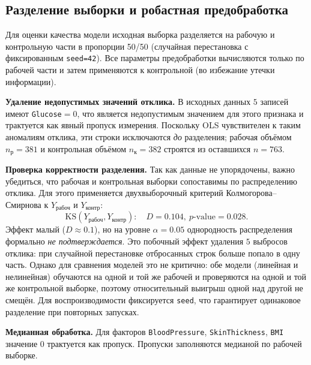 \documentclass[a4paper, 14pt]{extarticle}
\begin{document}
\subsection{Разделение выборки и робастная предобработка}
Для оценки качества модели исходная выборка разделяется на рабочую и контрольную части в пропорции
50/50 (случайная перестановка с фиксированным \texttt{seed=42}). Все параметры предобработки вычисляются только по
рабочей части и затем применяются к контрольной (во избежание утечки информации).

\medskip
\textbf{Удаление недопустимых значений отклика.} В исходных данных $5$ записей имеют
\texttt{Glucose}$=0$, что является недопустимым значением для этого признака и трактуется как явный пропуск измерения.
Поскольку OLS чувствителен к таким аномалиям отклика, эти строки исключаются \emph{до} разделения; рабочая объёмом
$n_{\text{р}}=381$ и контрольная объёмом $n_{\text{к}}=382$ строятся из оставшихся $n=763$.

\medskip
\textbf{Проверка корректности разделения.} Так как данные не упорядочены, важно убедиться, что рабочая и контрольная выборки сопоставимы по распределению отклика. Для этого применяется двухвыборочный критерий Колмогорова--Смирнова к $Y_{\text{рабоч}}$ и $Y_{\text{контр}}$:
\[
\text{KS}(Y_{\text{рабоч}}, Y_{\text{контр}}):\quad D = 0.104,\ p\text{-value} = 0.028.
\]
Эффект малый ($D\approx 0.1$), но на уровне $\alpha=0.05$ однородность распределения формально \textit{не подтверждается}.
Это побочный эффект удаления $5$ выбросов отклика: при случайной перестановке отбросанных строк больше попало в одну часть.
Однако для сравнения моделей это не критично: обе модели (линейная и нелинейная) обучаются на одной и той же рабочей и
проверяются на одной и той же контрольной выборке, поэтому относительный выигрыш одной над другой не смещён.
Для воспроизводимости фиксируется \texttt{seed}, что гарантирует одинаковое разделение при повторных запусках.

\medskip
\textbf{Медианная обработка.} Для факторов \texttt{BloodPressure}, \texttt{SkinThickness}, \texttt{BMI} значение 0
трактуется как пропуск. Пропуски заполняются медианой по рабочей выборке.
\end{document}
